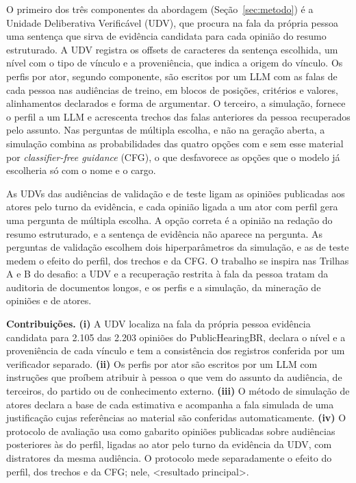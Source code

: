 O primeiro dos três componentes da abordagem (Seção~\ref{sec:metodo}) é a Unidade Deliberativa
Verificável (UDV), que procura na fala da própria pessoa uma sentença que sirva de evidência
candidata para cada opinião do resumo estruturado. A UDV registra os offsets de caracteres da
sentença escolhida, um nível com o tipo de vínculo e a proveniência, que indica a origem do vínculo.
Os perfis por ator, segundo componente, são escritos por um LLM com as falas de cada pessoa nas
audiências de treino, em blocos de posições, critérios e valores, alinhamentos declarados e forma de
argumentar. O terceiro, a simulação, fornece o perfil a um LLM e acrescenta trechos das falas
anteriores da pessoa recuperados pelo assunto. Nas perguntas de múltipla escolha, e não na geração
aberta, a simulação combina as probabilidades das quatro opções com e sem esse material por
\textit{classifier-free guidance} (CFG), o que desfavorece as opções que o modelo já escolheria só
com o nome e o cargo.

As UDVs das audiências de validação e de teste ligam as opiniões publicadas aos atores pelo turno da
evidência, e cada opinião ligada a um ator com perfil gera uma pergunta de múltipla escolha. A opção
correta é a opinião na redação do resumo estruturado, e a sentença de evidência não aparece na
pergunta. As perguntas de validação escolhem dois hiperparâmetros da simulação, e as de teste medem o
efeito do perfil, dos trechos e da CFG. O trabalho se inspira nas Trilhas A e B do desafio: a UDV e a
recuperação restrita à fala da pessoa tratam da auditoria de documentos longos, e os perfis e a
simulação, da mineração de opiniões e de atores.

\medskip\noindent\textbf{Contribui\c{c}\~oes.} \textbf{(i)} A UDV localiza na fala da própria pessoa
evidência candidata para 2.105 das 2.203 opiniões do PublicHearingBR, declara o nível e a
proveniência de cada vínculo e tem a consistência dos registros conferida por um verificador
separado. \textbf{(ii)} Os perfis por ator são escritos por um LLM com instruções que proíbem
atribuir à pessoa o que vem do assunto da audiência, de terceiros, do partido ou de conhecimento
externo. \textbf{(iii)} O método de simulação de atores declara a base de cada estimativa e
acompanha a fala simulada de uma justificação cujas referências ao material são conferidas
automaticamente. \textbf{(iv)} O protocolo de avaliação usa como gabarito opiniões publicadas sobre
audiências posteriores às do perfil, ligadas ao ator pelo turno da evidência da UDV, com distratores
da mesma audiência. O protocolo mede separadamente o efeito do perfil, dos trechos e da CFG; nele,
<resultado principal>.
